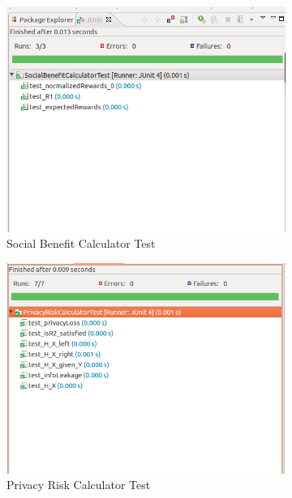 \documentclass[a4paper,11pt]{article}
\begin{document}
\begin{figure}[H]
\centering
\vspace{1cm}
\begin{subfigure}{.5\textwidth}
  \centering
  \includegraphics[scale=0.42]{APpendix/SBTest}
  \caption{Social Benefit Calculator Test}
\end{subfigure}%
\begin{subfigure}{.5\textwidth}
  \centering
  \includegraphics[scale=0.42]{APpendix/PRTest}
  \caption{Privacy Risk Calculator Test}
  \label{fig:sub2}
\end{subfigure}
\vspace{1cm}
\begin{subfigure}{.5\textwidth}

\end{subfigure}
\end{figure}
\end{document}
